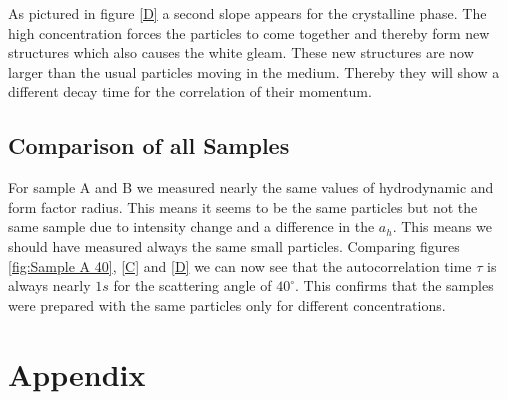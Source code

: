 \documentclass[]{article}
\begin{document}
As pictured in figure \ref{D} a second slope appears for the crystalline phase. The high concentration forces the particles to come together and thereby form new structures which also causes the white gleam. These new structures are now larger than the usual particles moving in the medium. Thereby they will show a different decay time for the correlation of their momentum.

\subsection{Comparison of all Samples}
For sample A and B we measured nearly the same values of hydrodynamic and form factor radius. This means it seems to be the same particles but not the same sample due to intensity change and a  difference in the $a_h$. This means we should have measured always the same small particles. Comparing figures \ref{fig:Sample A 40}, \ref{C} and \ref{D} we can now see that the autocorrelation time $\tau$ is always nearly $1s$ for the scattering angle of $40^\circ$. This confirms that the samples were prepared with the same particles only for different concentrations.


\newpage
\section{Appendix}
\end{document}
